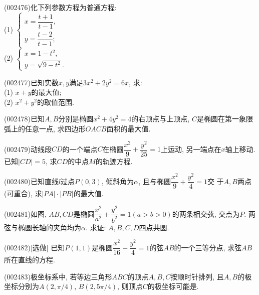 \item (002476)化下列参数方程为普通方程:\\ 
(1) $\left\{\begin{array}{l}x=\dfrac{t+1}{t-1},\\y=\dfrac{t-2}{t-1};\end{array}\right.$\\ 
(2) $\left\{\begin{array}{l}x=1-t^2,\\y=\sqrt{9-t^2}.\end{array}\right.$
\item (002477)已知实数$x,y$满足$3x^2+2y^2=6x$, 求:\\ 
(1) $x+y$的最大值;\\ 
(2) $x^2+y^2$的取值范围.
\item (002478)已知$A,B$分别是椭圆$x^2+4y^2=4$的右顶点与上顶点, $C$是椭圆在第一象限弧上的任意一点, 求四边形$OACB$面积的最大值.
\item (002479)动线段$CD$的一个端点$C$在椭圆$\dfrac{x^2}{9}+\dfrac{y^2}{25}=1$上运动, 另一端点在$x$轴上移动. 已知$|CD|=5$, 求$CD$的中点$M$的轨迹方程.
\item (002480)已知直线$l$过点$P(0,3)$, 倾斜角为$\alpha$, 且与椭圆$\dfrac{x^2}{9}+\dfrac{y^2}{4}=1$交
于$A,B$两点(可重合), 求$|PA|\cdot|PB|$的最大值.
\item (002481)如图, $AB,CD$是椭圆$\dfrac{x^2}{a^2}+\dfrac{y^2}{b^2}=1(a>b>0)$的两条相交弦, 交点为$P$. 两弦与椭圆长轴的夹角均为$\alpha$. 求证: $A,B,C,D$四点共圆.
\begin{center}
\end{center}
\item (002482)[选做]
已知$P(1,1)$是椭圆$\dfrac{x^2}{16}+\dfrac{y^2}{4}=1$的弦$AB$的一个三等分点,
求弦$AB$所在直线的方程.
\item (002483)极坐标系中, 若等边三角形$ABC$的顶点$A,B,C$按顺时针排列, 且$A,B$的极坐标分别为$A(2,\pi/4)$, $B(2,5\pi/4)$, 则顶点$C$的极坐标可能是.
